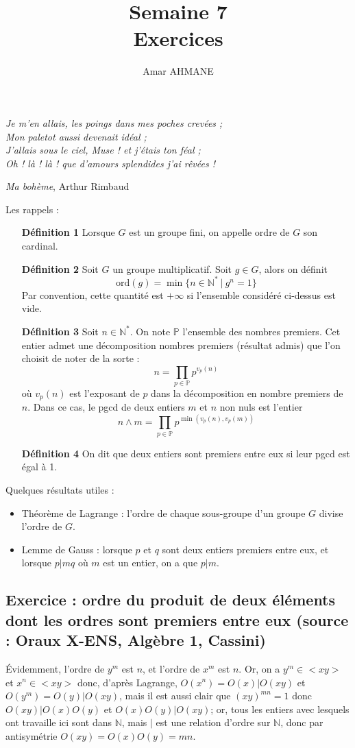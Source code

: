 \documentclass[17pt]{article}
\title{Semaine 7\\ Exercices}
\author{Amar AHMANE}
\def\N{\mathbb N}
\def\ord{\text{ord}}
\begin{document}
	\maketitle
	\begin{center}
		\textit{Je m'en allais, les poings dans mes poches crevées ;}\\
		\textit{Mon paletot aussi devenait idéal ;}\\
		\textit{J'allais sous le ciel, Muse ! et j'étais ton féal ;}\\
		\textit{Oh ! là ! là ! que d'amours splendides j'ai rêvées !}\\
	\end{center}
	\begin{flushright}
		\textit{Ma bohème}, Arthur Rimbaud
	\end{flushright}
	Les rappels : 
	\begin{itemize}
		\item[\bfseries Définition 1] Lorsque $G$ est un groupe fini, on appelle ordre de $G$ son cardinal.
		\item[\bfseries Définition 2] Soit $G$ un groupe multiplicatif. Soit $g\in G$, alors on définit \[\ord(g)=\min\lbrace n\in\N^*\ | \ g^n=1\rbrace\]
		Par convention, cette quantité est $+\infty$ si l'ensemble considéré ci-dessus est vide.
		\item[\bfseries Définition 3] Soit $n\in\N^*$. On note $\mathbb P$ l'ensemble des nombres premiers. Cet entier admet une décomposition nombres premiers (résultat admis) que l'on choisit de noter de la sorte : \[n=\prod_{p\in\mathbb P}p^{v_p(n)}\]
		où $v_p(n)$ est l'exposant de $p$ dans la décomposition en nombre premiers de $n$. Dans ce cas, le pgcd de deux entiers $m$ et $n$ non nuls est l'entier \[n\wedge m=\prod_{p\in\mathbb P}p^{\min(v_p(n),v_p(m))}\]
		\item[\bfseries Définition 4] On dit que deux entiers sont premiers entre eux si leur pgcd est égal à 1.
	\end{itemize}
	Quelques résultats utiles :
	\begin{itemize}
		\item Théorème de Lagrange : l'ordre de chaque sous-groupe d'un groupe $G$ divise l'ordre de $G$.
		\item Lemme de Gauss : lorsque $p$ et $q$ sont deux entiers premiers entre eux, et lorsque $p|mq$ où $m$ est un entier, on a que $p|m$.
	\end{itemize}
	\subsection*{Exercice : ordre du produit de deux éléments dont les ordres sont premiers entre eux (source : Oraux X-ENS, Algèbre 1, Cassini)}
	Évidemment, l'ordre de $y^m$ est $n$, et l'ordre de $x^m$ est $n$. Or, on a $y^m\in <xy>$ et $x^n\in <xy>$ donc, d'après Lagrange, $O(x^n)=O(x)|O(xy)$ et $O(y^m)=O(y)|O(xy)$, mais il est aussi clair que $(xy)^{mn}=1$ donc $O(xy)|O(x)O(y)$ et $O(x)O(y)|O(xy)$; or, tous les entiers avec lesquels ont travaille ici sont dans $\N$, mais $|$ est une relation d'ordre sur $\N$, donc par antisymétrie $O(xy)=O(x)O(y)=mn$.
\end{document}
